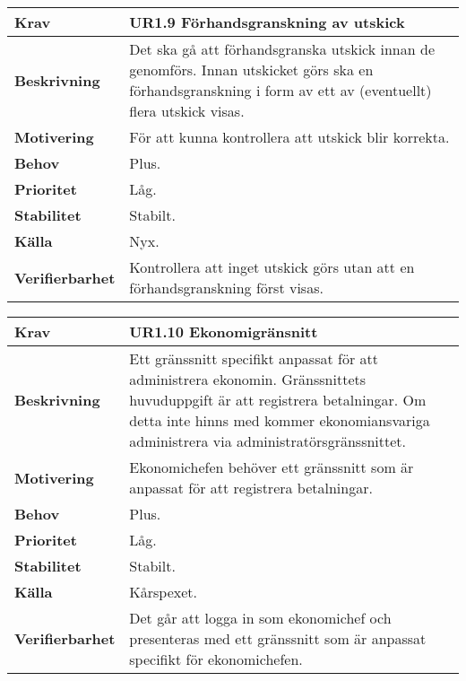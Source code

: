 \documentclass[a4paper, twoside, 11pt, titlepage]{article}
\begin{document}
		\begin{tabular} { p{2.6cm} p{12.5cm} }
			\hline
			\sffamily\textbf{Krav} & \sffamily\textbf{UR1.9 Förhandsgranskning av utskick  } \\
			\hline
			\sffamily\textbf{Beskrivning} & Det ska gå att förhandsgranska utskick innan de genomförs. Innan utskicket görs ska en förhandsgranskning i form av ett av (eventuellt) flera utskick visas.  \\
			\hline
			\sffamily\textbf{Motivering} & För att kunna kontrollera att utskick blir korrekta.  \\
			\hline
			\sffamily\textbf{Behov} & Plus.  \\
			\hline
			\sffamily\textbf{Prioritet} & Låg.  \\
			\hline
			\sffamily\textbf{Stabilitet} & Stabilt.  \\
			\hline
			\sffamily\textbf{Källa} & Nyx.  \\
			\hline
			\sffamily\textbf{Verifierbarhet} & Kontrollera att inget utskick görs utan att en förhandsgranskning först visas.  \\
			\hline
		\end{tabular}
		\vspace{6mm}

		\begin{tabular} { p{2.6cm} p{12.5cm} }
			\hline
			\sffamily\textbf{Krav} & \sffamily\textbf{UR1.10 Ekonomigränsnitt  } \\
			\hline
			\sffamily\textbf{Beskrivning} & Ett gränssnitt specifikt anpassat för att administrera ekonomin. Gränssnittets huvuduppgift är att registrera betalningar. Om detta inte hinns med kommer ekonomiansvariga administrera via administratörsgränssnittet.  \\
			\hline
			\sffamily\textbf{Motivering} & Ekonomichefen behöver ett gränssnitt som är anpassat för att registrera betalningar.  \\
			\hline
			\sffamily\textbf{Behov} & Plus.  \\
			\hline
			\sffamily\textbf{Prioritet} & Låg.  \\
			\hline
			\sffamily\textbf{Stabilitet} & Stabilt.  \\
			\hline
			\sffamily\textbf{Källa} & Kårspexet.  \\
			\hline
			\sffamily\textbf{Verifierbarhet} & Det går att logga in som ekonomichef och presenteras med ett gränssnitt som är anpassat specifikt för ekonomichefen.  \\
			\hline
		\end{tabular}
		\vspace{6mm}
\end{document}
